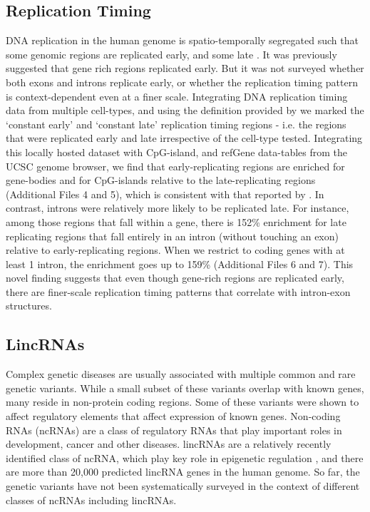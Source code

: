 \documentclass[10pt]{bmc_article}
\newenvironment{bmcformat}{\baselineskip20pt\sloppy\setboolean{publ}{false}}{\baselineskip20pt\sloppy}
\begin{document}
\begin{bmcformat}
\subsection*{Replication Timing}
DNA replication in the human genome is spatio-temporally segregated such that some genomic regions are replicated early, and some late \cite{Hansen}. It was previously suggested that gene rich regions replicated early. But it was not surveyed whether both exons and introns replicate early, or whether the replication timing pattern is context-dependent even at a finer scale. 
Integrating DNA replication timing data from multiple cell-types, and using the definition provided by \cite{Hansen} we marked the ‘constant early’ and ‘constant late’ replication timing regions - i.e. the regions that were replicated early and late irrespective of the cell-type tested. Integrating this locally hosted dataset with CpG-island, and refGene data-tables from the UCSC genome browser, we find  that early-replicating regions are enriched for gene-bodies and for CpG-islands relative to the late-replicating regions (Additional Files 4 and 5), which is consistent with that reported by \cite{Hansen}. In contrast, introns were relatively more likely to be replicated late. For instance, among those regions that fall within a gene, there is 152\% enrichment for late replicating regions that fall entirely in an intron (without touching an exon) relative to early-replicating regions. When we restrict to coding genes with at least 1 intron, the enrichment goes up to 159\% (Additional Files 6 and 7). This novel finding suggests that even though gene-rich regions are replicated early, there are finer-scale replication timing patterns that correlate with intron-exon structures.

\subsection*{LincRNAs}
Complex genetic diseases are usually associated with multiple common and rare genetic variants. While a small subset of these variants overlap with known genes, many reside in non-protein coding regions. Some of these variants were shown to affect regulatory elements that affect expression of known genes. Non-coding RNAs (ncRNAs) are a class of regulatory RNAs that play important roles in development, cancer and other diseases. lincRNAs are a relatively recently identified class of ncRNA, which play key role in epigenetic regulation \cite{Lee}, and there are more than 20,000 predicted lincRNA genes in the human genome. So far, the genetic variants have not been systematically surveyed in the context of different classes of ncRNAs including lincRNAs. 


\end{bmcformat}
\end{document}
